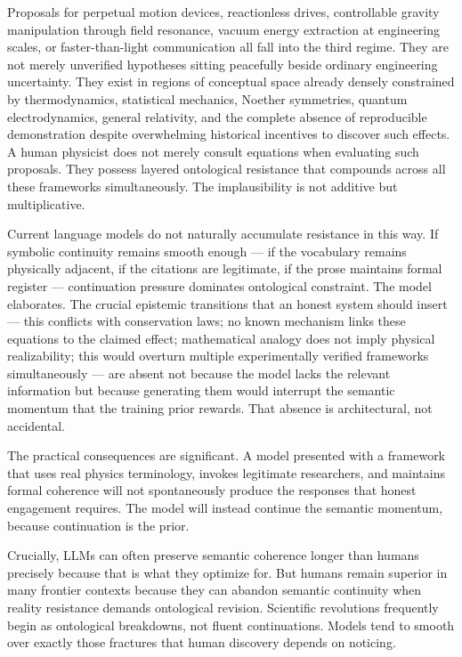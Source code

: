 \documentclass[12pt, a4paper]{article}
\theoremstyle{remark}
\begin{document}
Proposals for perpetual motion devices, reactionless drives, controllable gravity manipulation through field resonance, vacuum energy extraction at engineering scales, or faster-than-light communication all fall into the third regime. They are not merely unverified hypotheses sitting peacefully beside ordinary engineering uncertainty. They exist in regions of conceptual space already densely constrained by thermodynamics, statistical mechanics, Noether symmetries, quantum electrodynamics, general relativity, and the complete absence of reproducible demonstration despite overwhelming historical incentives to discover such effects. A human physicist does not merely consult equations when evaluating such proposals. They possess layered ontological resistance that compounds across all these frameworks simultaneously. The implausibility is not additive but multiplicative.

Current language models do not naturally accumulate resistance in this way. If symbolic continuity remains smooth enough --- if the vocabulary remains physically adjacent, if the citations are legitimate, if the prose maintains formal register --- continuation pressure dominates ontological constraint. The model elaborates. The crucial epistemic transitions that an honest system should insert --- this conflicts with conservation laws; no known mechanism links these equations to the claimed effect; mathematical analogy does not imply physical realizability; this would overturn multiple experimentally verified frameworks simultaneously --- are absent not because the model lacks the relevant information but because generating them would interrupt the semantic momentum that the training prior rewards. That absence is architectural, not accidental.

The practical consequences are significant. A model presented with a framework that uses real physics terminology, invokes legitimate researchers, and maintains formal coherence will not spontaneously produce the responses that honest engagement requires. The model will instead continue the semantic momentum, because continuation is the prior.

Crucially, LLMs can often preserve semantic coherence longer than humans precisely because that is what they optimize for. But humans remain superior in many frontier contexts because they can abandon semantic continuity when reality resistance demands ontological revision. Scientific revolutions frequently begin as ontological breakdowns, not fluent continuations. Models tend to smooth over exactly those fractures that human discovery depends on noticing.
\end{document}
